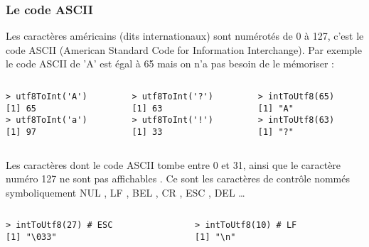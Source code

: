 \documentclass[10pt]{beamer}
\begin{document}
\begin{frame}[fragile]
  \frametitle{Le code ASCII}
  Les \alert{caractères américains (dits internationaux)} sont numérotés de 0 à 127, c'est le code ASCII (American Standard Code for Information Interchange).
  Par exemple le code ASCII de 'A' est égal à 65 mais on n'a pas besoin de le mémoriser :
  
\begin{columns}[t]
\begin{column}{0.33\textwidth}
  \begin{lstlisting}
> utf8ToInt('A')
[1] 65    
> utf8ToInt('a')
[1] 97
  \end{lstlisting}
\end{column}
\begin{column}{0.33\textwidth}
  \begin{lstlisting}
> utf8ToInt('?')
[1] 63
> utf8ToInt('!')
[1] 33    
  \end{lstlisting}
\end{column}
\begin{column}{0.33\textwidth}
  \begin{lstlisting}
> intToUtf8(65)
[1] "A"
> intToUtf8(63)
[1] "?"    
  \end{lstlisting}
\end{column}
\end{columns}

Les caractères dont le code ASCII tombe entre 0 et 31, ainsi que le caractère numéro 127 ne sont pas affichables .
Ce sont les \alert{caractères de contrôle} nommés symboliquement NUL , LF , BEL , CR , ESC , DEL \dots
\begin{columns}[t]
\begin{column}{0.48\textwidth}
  \begin{lstlisting}
> intToUtf8(27) # ESC
[1] "\033"
  \end{lstlisting}
\end{column}
\begin{column}{0.48\textwidth}
  \begin{lstlisting}
> intToUtf8(10) # LF
[1] "\n"
  \end{lstlisting}

\end{column}
\end{columns}
\end{frame}
\end{document}
